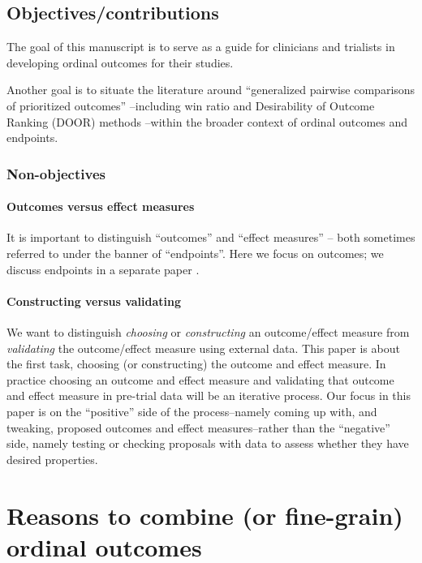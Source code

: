\documentclass[
  11pt,
  fleqn
]{article}
\begin{document}
\subsection{Objectives/contributions}

The goal of this manuscript is to serve as a guide for clinicians
and trialists
in developing ordinal outcomes for their studies.

Another goal is to situate the literature around ``generalized
pairwise comparisons of prioritized outcomes''
\citep{buyseGeneralizedPairwiseComparisons2022}--including win ratio
\citep{pocockWinRatioNew2012} and Desirability of Outcome Ranking (DOOR)
methods \citep{evansDesirabilityOutcomeRanking2015,
ongUnlockingDOORHow2023}--within the broader context of ordinal outcomes and
endpoints.

\subsubsection{Non-objectives}

\paragraph{Outcomes versus effect measures} It is important to
distinguish ``outcomes'' and ``effect measures'' -- both
sometimes referred to under the banner of ``endpoints''. Here we
focus on outcomes; we discuss endpoints in a separate paper .

\paragraph{Constructing versus validating} We want to distinguish
\emph{choosing} or \emph{constructing} an
outcome/effect
measure from \emph{validating} the outcome/effect measure using
external data.
This paper is about the first task, choosing (or constructing)
the outcome and
effect measure. In practice choosing an outcome and effect measure and
validating that outcome and effect measure in pre-trial data will be an
iterative process. Our focus in this paper is on the ``positive''
side of the
process--namely coming up with, and tweaking, proposed outcomes and effect
measures--rather than the ``negative'' side, namely testing or checking
proposals with data to assess whether they have desired properties.

\section{Reasons to combine (or fine-grain) ordinal outcomes}
\end{document}
